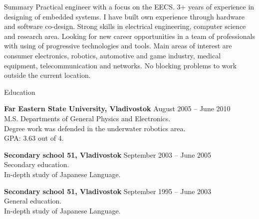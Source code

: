 \documentclass{template}
\begin{document}

\begin{rSection}{Summary}
Practical engineer with a focus on the EECS. 3+ years of experience in designing of embedded systems. I have built own experience through hardware and software co-design. Strong skills in electrical engineering, computer science and research area. Looking for new career opportunities in a team of professionals with using of progressive technologies and tools. Main areas of interest are consumer electronics, robotics, automotive and game industry, medical equipment, telecommunication and networks. No blocking problems to work outside the current location.
\end{rSection}


\begin{rSection}{Education}

{\bf Far Eastern State University, Vladivostok} \hfill {August 2005 -- June 2010} \\ 
M.S. Departments of General Physics and Electronics. \\
Degree work was defended in the underwater robotics area. \\
GPA: 3.63 out of 4.

{\bf Secondary school 51, Vladivostok} \hfill {September 2003 -- June 2005} \\
Secondary education. \\
In-depth study of Japanese Language.

{\bf Secondary school 51, Vladivostok} \hfill {September 1995 -- June 2003} \\
General education. \\
In-depth study of Japanese Language.

\end{rSection}

\end{document}

